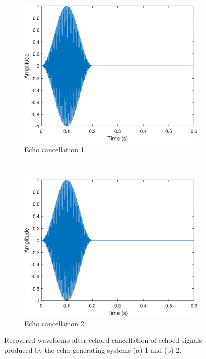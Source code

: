 \documentclass{article}
\begin{document}
\begin{figure}[h!]
	\centering
	\begin{subfigure}[h!]{0.5\textwidth}
		\includegraphics[width=\textwidth]{figs/hw01q2_echoed_rec1.eps}
		\caption{Echo cancellation 1}
	\end{subfigure}%
	~ %
	\begin{subfigure}[h!]{0.5\textwidth}
		\includegraphics[width=\textwidth]{figs/hw01q2_echoed_rec2.eps}
		\caption{Echo cancellation 2}
	\end{subfigure}
	\caption{Recovered waveforms after echoed cancellation of echoed signals produced by the echo-generating systems (a) 1 and (b) 2.}
\end{figure}
\end{document}
